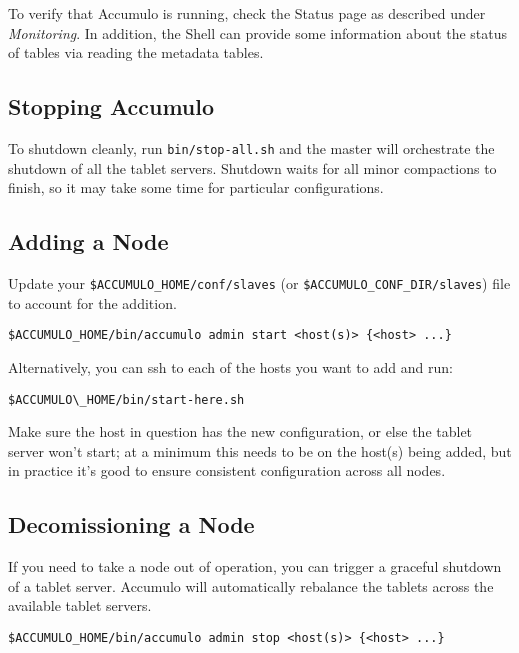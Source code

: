 To verify that Accumulo is running, check the Status page as described under
\emph{Monitoring}. In addition, the Shell can provide some information about the status of
tables via reading the metadata tables.

\subsection{Stopping Accumulo}

To shutdown cleanly, run \texttt{bin/stop-all.sh} and the master will orchestrate the
shutdown of all the tablet servers. Shutdown waits for all minor compactions to finish, so it may
take some time for particular configurations.

\subsection{Adding a Node}

Update your \texttt{\$ACCUMULO\_HOME/conf/slaves} (or \texttt{\$ACCUMULO\_CONF\_DIR/slaves}) file to account for the addition.

\begingroup\fontsize{8pt}{8pt}\selectfont\begin{verbatim}
$ACCUMULO_HOME/bin/accumulo admin start <host(s)> {<host> ...}
\end{verbatim}\endgroup

Alternatively, you can ssh to each of the hosts you want to add and run:

\begingroup\fontsize{8pt}{8pt}\selectfont\begin{verbatim}
$ACCUMULO\_HOME/bin/start-here.sh
\end{verbatim}\endgroup

Make sure the host in question has the new configuration, or else the tablet 
server won't start; at a minimum this needs to be on the host(s) being added, 
but in practice it's good to ensure consistent configuration across all nodes.

\subsection{Decomissioning a Node}

If you need to take a node out of operation, you can trigger a graceful shutdown of a tablet 
server. Accumulo will automatically rebalance the tablets across the available tablet servers.

\begingroup\fontsize{8pt}{8pt}\selectfont\begin{verbatim}
$ACCUMULO_HOME/bin/accumulo admin stop <host(s)> {<host> ...}
\end{verbatim}\endgroup

